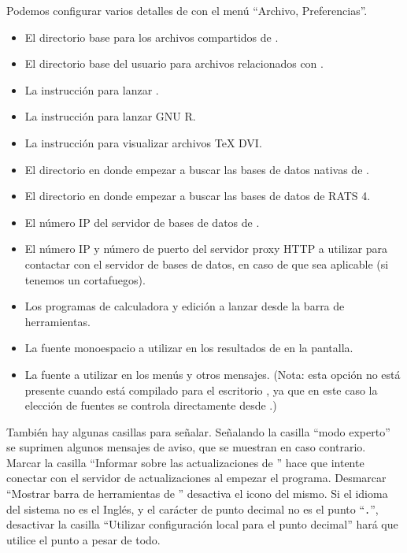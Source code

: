 Podemos configurar varios detalles de  con el menú
``Archivo, Preferencias''.


\begin{itemize}
\item El directorio base para los archivos compartidos de .

\item El directorio base del usuario para archivos relacionados con
  .

\item La instrucción para lanzar .

\item La instrucción para lanzar GNU R.

\item La instrucción para visualizar archivos TeX DVI.

\item El directorio en donde empezar a buscar las bases de datos
  nativas de .

\item El directorio en donde empezar a buscar las bases de datos de
  RATS 4.

\item El número IP del servidor de bases de datos de .

\item El número IP y número de puerto del servidor proxy HTTP a
  utilizar para contactar con el servidor de bases de datos, en caso
  de que sea aplicable (si tenemos un cortafuegos).

\item Los programas de calculadora y edición a lanzar desde la barra
  de herramientas.

\item La fuente monoespacio a utilizar en los resultados de
   en la pantalla.

\item La fuente a utilizar en los menús y otros mensajes. (Nota: esta
  opción no está presente cuando  está compilado para el
  escritorio , ya que en este caso la elección de fuentes
  se controla directamente desde .)

\end{itemize}

También hay algunas casillas para señalar. Señalando la casilla ``modo
experto'' se suprimen algunos mensajes de aviso, que se muestran en
caso contrario. Marcar la casilla ``Informar sobre las actualizaciones
de '' hace que  intente conectar con el servidor
de actualizaciones al empezar el programa. Desmarcar ``Mostrar barra
de herramientas de '' desactiva el icono del mismo. Si el
idioma del sistema no es el Inglés, y el carácter de punto decimal no
es el punto ``\texttt{.}'', desactivar la casilla ``Utilizar
configuración local para el punto decimal'' hará que 
utilice el punto a pesar de todo.


